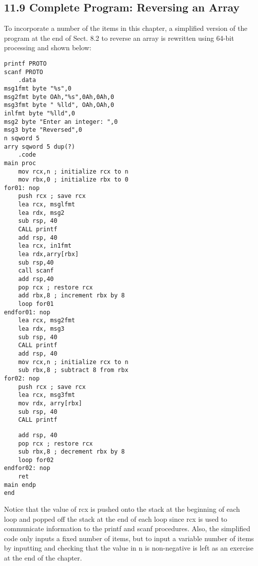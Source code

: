 \documentclass[10pt]{article}
\begin{document}
\subsection*{11.9 Complete Program: Reversing an Array}
To incorporate a number of the items in this chapter, a simplified version of the program at the end of Sect. 8.2 to reverse an array is rewritten using 64-bit processing and shown below:

\begin{verbatim}
printf PROTO
scanf PROTO
    .data
msg1fmt byte "%s",0
msg2fmt byte OAh,"%s",0Ah,0Ah,0
msg3fmt byte " %lld", OAh,OAh,0
inlfmt byte "%lld",0
msg2 byte "Enter an integer: ",0
msg3 byte "Reversed",0
n sqword 5
arry sqword 5 dup(?)
    .code
main proc
    mov rcx,n ; initialize rcx to n
    mov rbx,0 ; initialize rbx to 0
for01: nop
    push rcx ; save rcx
    lea rcx, msglfmt
    lea rdx, msg2
    sub rsp, 40
    CALL printf
    add rsp, 40
    lea rcx, in1fmt
    lea rdx,arry[rbx]
    sub rsp,40
    call scanf
    add rsp,40
    pop rcx ; restore rcx
    add rbx,8 ; increment rbx by 8
    loop for01
endfor01: nop
    lea rcx, msg2fmt
    lea rdx, msg3
    sub rsp, 40
    CALL printf
    add rsp, 40
    mov rcx,n ; initialize rcx to n
    sub rbx,8 ; subtract 8 from rbx
for02: nop
    push rcx ; save rcx
    lea rcx, msg3fmt
    mov rdx, arry[rbx]
    sub rsp, 40
    CALL printf
\end{verbatim}

\begin{verbatim}
    add rsp, 40
    pop rcx ; restore rcx
    sub rbx,8 ; decrement rbx by 8
    loop for02
endfor02: nop
    ret
main endp
end
\end{verbatim}

Notice that the value of rcx is pushed onto the stack at the beginning of each loop and popped off the stack at the end of each loop since rcx is used to communicate information to the printf and scanf procedures. Also, the simplified code only inputs a fixed number of items, but to input a variable number of items by inputting and checking that the value in n is non-negative is left as an exercise at the end of the chapter.
\end{document}
